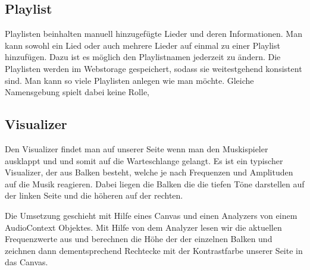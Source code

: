 \documentclass{article}
\begin{document}
\subsection{Playlist}
Playlisten beinhalten manuell hinzugefügte Lieder und deren Informationen. Man kann sowohl ein Lied oder auch mehrere Lieder auf einmal zu einer Playlist hinzufügen. Dazu ist es möglich den Playlistnamen jederzeit zu ändern. Die Playlisten werden im Webstorage gespeichert, sodass sie weitestgehend konsistent sind. Man kann so viele Playlisten anlegen wie man möchte. Gleiche Namensgebung spielt dabei keine Rolle,
\subsection{Visualizer}
Den Visualizer findet man auf unserer Seite wenn man den Muskispieler ausklappt und und somit auf die Warteschlange gelangt. Es ist ein typischer Visualizer, der aus Balken besteht, welche je nach Frequenzen und Amplituden auf die Musik reagieren. Dabei liegen die Balken die die tiefen Töne darstellen auf der linken Seite und die höheren auf der rechten.\newline

\noindent Die Umsetzung geschieht mit Hilfe eines Canvas und einen Analyzers von einem AudioContext Objektes. Mit Hilfe von dem Analyzer lesen wir die aktuellen Frequenzwerte aus und berechnen die Höhe der der einzelnen Balken und zeichnen dann dementsprechend Rechtecke mit der Kontrastfarbe unserer Seite in das Canvas.
\end{document}
